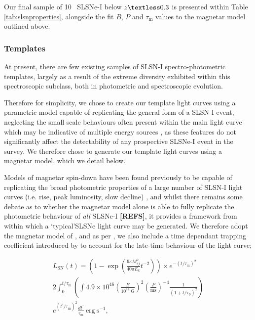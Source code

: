 \documentclass[a4paper,fleqn,usenatbib]{mnras}
\newcommand{\angus}[1]{\color{JungleGreen}#1\color{black}}
\newcommand{\comment}[1]{\textbf{[#1]}}
\begin{document}
Our final sample of \angus{10~} SLSNe-I below $z\textless0.3$ is presented within Table \ref{tab:slsnproperties}, alongside the fit $B$, $P$ and $\tau_{\mathrm{m}}$ values to the magnetar model outlined above. 

\subsubsection{Templates}
\label{sec:simSLSN}
{\angus{At present, there are few existing samples of SLSN-I spectro-photometric templates, largely as a result of the extreme diversity exhibited within this spectroscopic subclass, both in photometric and spectroscopic evolution.}} 

Therefore for simplicity, we chose to create our template light curves using a parametric model capable of replicating the general form of a SLSN-I event, neglecting the small scale behaviours often present within the main light curve which may be indicative of multiple energy sources \citep[e.g.][]{Inserra2017b}, as these features do not significantly affect the detectability of any prospective SLSNe-I event in the survey. We therefore chose to generate our template light curves using a magnetar model, which we detail below.

Models of magnetar spin-down have been found previously to be capable of replicating the broad photometric properties of a large number of SLSN-I light curves (i.e. rise, peak luminosity, slow decline) \citep{Inserra2013,Nicholl2013,Nicholl2017B,Dessart2019}, and whilst there remains some debate as to whether the magnetar model alone is able to fully replicate the photometric behaviour of {\textit{all}} SLSNe-I \comment{\angus{REFS}}, it provides a framework from within which a \lq typical\rq SLSNe light curve may be generated. We therefore adopt the magnetar model of \cite{Inserra2013}, and as per \cite{Prajs2016}, we also include a time dependant trapping coefficient introduced by \cite{Wange2015} to account for the late-time behaviour of the light curve;

\begin{multline}
L_{\mathrm{SN}}\left ( t \right )= \left(1- \exp{\left(\frac{9\kappa M_{ej}^{2}}{40\pi E_{k}}t^{-2} \right)}\right)\times e^{-(t/\tau_{\mathrm{m}})^{2}} \\ 2\int_{0}^{t/\tau_{\mathrm{m}}}
\left(\int 4.9\times10^{46} \left(\frac{B}{10^{14}~\mathrm{G}} \right)^{2}\left(\frac{P}{\mathrm{ms}} \right)^{-4} \frac{1}{(1 + t/\tau_{\mathrm{p}})^{2}}\right ) \\ e^{(t^{\prime}/\tau_{\mathrm{m}})^{2}}\frac{dt^{\prime}}{\tau_{\mathrm{m}}} \mathrm{~ erg~ s^{-1}},
\label{equation_magnetar}
\end{multline}
\end{document}
